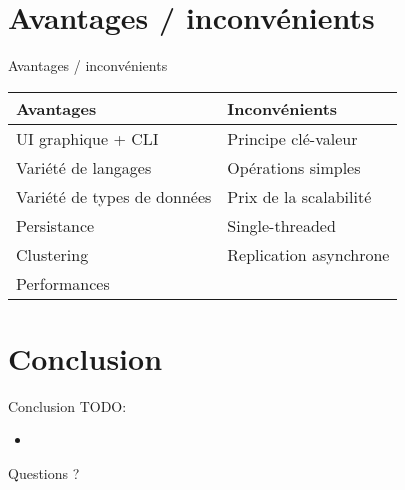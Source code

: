 \documentclass[aspectratio=169]{beamer}
\newcommand{\TODO}{TODO:}
\begin{document}
\section{Avantages / inconvénients}
\begin{frame}{Avantages / inconvénients}
  \begin{center}
     \begin{tabular}{|l|l|}
     \hline
      \textbf{Avantages} & \textbf{Inconvénients} \\
     \hline
     \hline
        UI graphique + CLI & Principe clé-valeur \\
     \hline
     Variété de langages & Opérations simples \\
     \hline
     Variété de types de données & Prix de la scalabilité \\
     \hline
     Persistance & Single-threaded \\
     \hline
     Clustering & Replication asynchrone \\
     \hline
     Performances & \\
     \hline
     \end{tabular}

    \end{center}
\end{frame}

\section{Conclusion}
\begin{frame}{Conclusion}
\TODO
 \begin{itemize}
  \item 
 \end{itemize}
\end{frame}

\begin{frame}{Questions ?}
\end{frame}
\end{document}
